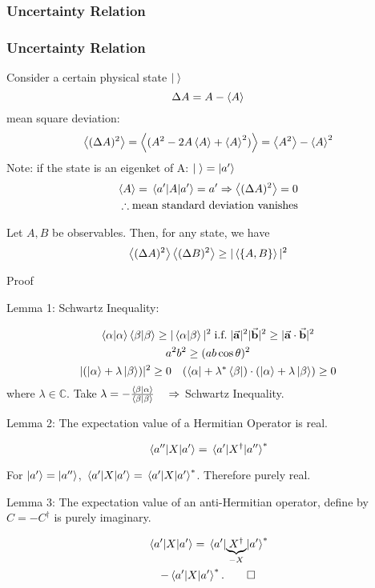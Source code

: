 \subsubsection{Uncertainty Relation}
\begin{frame}
	\frametitle{Uncertainty Relation}
	Consider a certain physical state $\ket{\;}$\\
	\[\Delta A = A - \ev{A}\]
	mean square deviation:
	\[
		\ev{(\Delta A)^2} = \ev{ (A^2 - 2A \ev{A} + \ev{A}^2 ) } = \ev{A^2} - \ev{A}^2
	\]
	Note: if the state is an eigenket of A: $\ket{\;} = \ket{a'}$
	\[\begin{split}
			\ev{A} = \mel{a'}{A}{a'} = a' \Rightarrow \ev{(\Delta A)^2} = 0 \\ \therefore \text{mean standard deviation vanishes}
		\end{split}
	\]
\end{frame}
\begin{frame}
	\begin{theorem}
		Let $A,B$ be observables. Then, for any state, we have
		\[
			\ev{(\Delta A)^2}\ev{(\Delta B)^2} \ge |\ev{\acomm{A}{B}}|^2
		\]
	\end{theorem}
	Proof

	Lemma 1: Schwartz Inequality:

	\begin{gather*}
		\ip{\alpha} \ip{\beta} \ge |\ip{\alpha}{\beta}|^2 \; \text{i.f.} \; |\va a|^2 |\va b|^2 \ge  |\va a \cdot \va b|^2\\
		a^2 b^2 \ge (ab \cos{\theta})^2\\
		|(\ket \alpha + \lambda \ket \beta)|^2 \ge 0  \quad (\bra{\alpha} + \lambda^* \bra \beta) \cdot (\ket \alpha + \lambda \ket \beta) \ge 0
	\end{gather*}
	where $\lambda \in \mathbb{C}$. Take $\lambda = -\frac{\ip{\beta}{\alpha}}{\ip{\beta}{\beta}} \quad \Rightarrow$ Schwartz Inequality.
\end{frame}
\begin{frame}
	Lemma 2: The expectation value of a Hermitian Operator is real.

	\[
		\mel{a''}{X}{a'} = \mel{a'}{X^\dag}{a''}^*
	\]

	For $\ket{a'} = \ket{a''}$, $\mel{a'}{X}{a'} = \mel{a'}{X}{a'}^*$. Therefore purely real.

	\vfill

	Lemma 3: The expectation value of an anti-Hermitian operator, define by $C=-C^\dag$ is purely imaginary.

	\begin{gather*}
		\mel{a'}{X}{a'} = \mel{a'}{\underbrace{X^\dag}_{-X}}{a'}^*\\
		-\mel{a'}{X}{a'}^*. \qed
	\end{gather*}
\end{frame}

